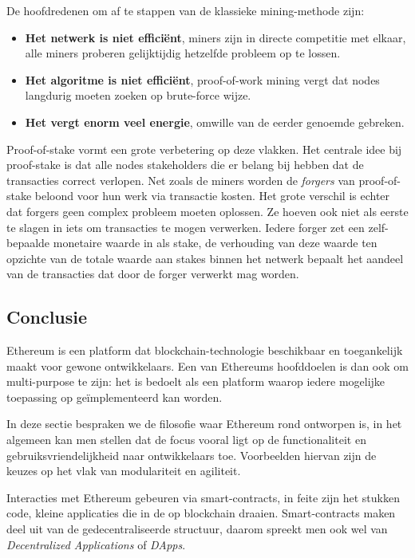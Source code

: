 		De hoofdredenen om af te stappen van de klassieke mining-methode zijn:
		\begin{itemize}
			\item \textbf{Het netwerk is niet efficiënt}, miners zijn in directe competitie met elkaar, alle miners proberen gelijktijdig hetzelfde probleem op te lossen.
			\item \textbf{Het algoritme is niet efficiënt}, proof-of-work mining vergt dat nodes langdurig moeten zoeken op brute-force wijze. 
			\item \textbf{Het vergt enorm veel energie}, omwille van de eerder genoemde gebreken.
		\end{itemize}
		 Proof-of-stake vormt een grote  verbetering op deze vlakken. Het centrale idee bij proof-stake is dat alle nodes stakeholders die er belang bij hebben dat de transacties correct verlopen. Net zoals de miners worden de \textit{forgers} van proof-of-stake beloond voor hun werk via transactie kosten. Het grote verschil is echter dat forgers geen complex probleem moeten oplossen. Ze hoeven ook niet als eerste te slagen in iets om transacties te mogen verwerken. Iedere forger zet een zelf-bepaalde monetaire waarde in als stake, de verhouding van deze waarde ten opzichte van de totale waarde aan stakes binnen het netwerk bepaalt het aandeel van de transacties dat door de forger verwerkt mag worden.
	\subsection{Conclusie}
		 Ethereum is een platform dat blockchain-technologie beschikbaar en toegankelijk maakt voor gewone ontwikkelaars. Een van Ethereums hoofddoelen is dan ook om multi-purpose te zijn: het is bedoelt als een platform waarop iedere mogelijke toepassing op geïmplementeerd kan worden. ~\autocite{Buterin2014}
		 
		 In deze sectie bespraken we de filosofie waar Ethereum rond ontworpen is, in het algemeen kan men stellen dat de focus vooral ligt op de functionaliteit en gebruiksvriendelijkheid naar ontwikkelaars toe. Voorbeelden hiervan zijn de keuzes op het vlak van modulariteit en agiliteit. ~\autocite{Buterin2014}
		 
		 Interacties met Ethereum gebeuren via smart-contracts, in feite zijn het stukken code, kleine applicaties die in de op blockchain draaien. Smart-contracts maken deel uit van de gedecentraliseerde structuur, daarom spreekt men ook wel van \textit{Decentralized Applications} of \textit{DApps}.
		 

